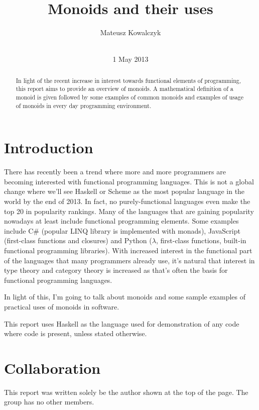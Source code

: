 \documentclass{acm_proc_article-sp}
\begin{document}
\title{Monoids and their uses}
\author{
\alignauthor
Mateusz Kowalczyk\\
       \\
}

\date{1 May 2013}

\maketitle
\begin{abstract}
In light of the recent increase in interest towards functional
elements of programming, this report aims to provide an overview of
monoids. A mathematical definition of a monoid is given followed by
some examples of common monoids and examples of usage of monoids in
every day programming environment.
\end{abstract}


\section{Introduction}
There has recently been a trend where more and more programmers are
becoming interested with functional programming languages. This is not
a global change where we'll see Haskell or Scheme as the most popular
language in the world by the end of 2013. In fact, no
purely-functional languages even make the top 20 in popularity
rankings\cite{tiobe:rankings}. Many of the languages that are gaining
popularity nowadays at least include functional programming
elements. Some examples include C\# (popular LINQ library is
implemented with monads), JavaScript (first-class functions and
closures) and Python ($\lambda$, first-class functions, built-in
functional programming libraries\cite{python:itertools}). With
increased interest in the functional part of the languages that many
programmers already use, it's natural that interest in type theory and
category theory is increased as that's often the basis for functional
programming languages.

In light of this, I'm going to talk about monoids
and some sample examples of practical uses of monoids in
software.

This report uses Haskell as the language used for demonstration of any
code where code is present, unless stated otherwise.

\section{Collaboration}
This report was written solely be the author shown at the top of the
page. The group has no other members.
\end{document}
